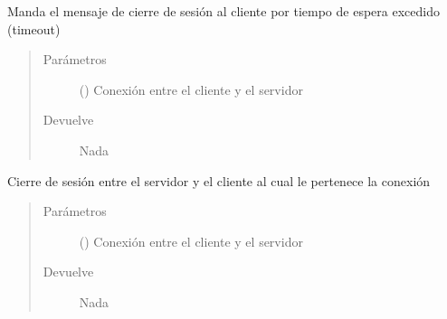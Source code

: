 \documentclass[letterpaper,10pt,spanish,openany,oneside]{sphinxmanual}
\begin{document}
\label{\detokenize{pokemonServer:module-pokemonServer}}

\begin{fulllineitems}
\label{\detokenize{pokemonServer:pokemonServer.avisoTimeout}}
Manda el mensaje de cierre de sesión al cliente por tiempo de espera excedido (timeout)
\begin{quote}\begin{description}
\item[{Parámetros}] \leavevmode
{} () \textendash{} Conexión entre el cliente y el servidor

\item[{Devuelve}] \leavevmode
Nada

\end{description}\end{quote}

\end{fulllineitems}


\begin{fulllineitems}
\label{\detokenize{pokemonServer:pokemonServer.cerrarSesion}}
Cierre de sesión entre el servidor y el cliente al cual le pertenece la conexión
\begin{quote}\begin{description}
\item[{Parámetros}] \leavevmode
{} () \textendash{} Conexión entre el cliente y el servidor

\item[{Devuelve}] \leavevmode
Nada

\end{description}\end{quote}

\end{fulllineitems}
\end{document}
